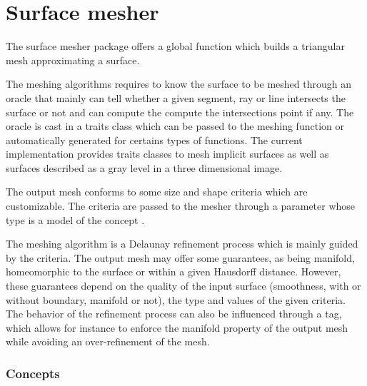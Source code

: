 \chapter{Surface mesher}


The surface mesher package offers a global function
which builds a triangular mesh approximating a surface.

The meshing algorithms requires to know the surface to be meshed
through an oracle that mainly can tell whether a
given segment, ray or line  intersects the surface or not
and can compute the compute the
intersections point if any. The oracle is cast in a traits class
which can be passed to the meshing function
or automatically generated for certains types of functions.
The current implementation provides 
traits classes 
to mesh implicit surfaces as well as  surfaces described 
as a gray level in a three
dimensional image.
 
The output mesh conforms to some size and shape criteria 
which are customizable. The criteria are passed to the mesher
through a parameter 
whose type is a model of the
concept .

The meshing algorithm is a Delaunay refinement process
which is mainly guided by the criteria. 
The output mesh may offer some guarantees, as being manifold,
homeomorphic to the surface or within a given
Hausdorff distance.  However, these guarantees depend 
on the quality of the input surface (smoothness, with or without
boundary, manifold or  not),
the type and values of the given criteria. 
The behavior of the refinement process can also be influenced through
a tag, which allows for instance to enforce the manifold property
of  the output mesh  while avoiding an over-refinement of the mesh.


\subsection*{Concepts}

\\
 \\
 \\
 \\
 \\
 \\
 \\


